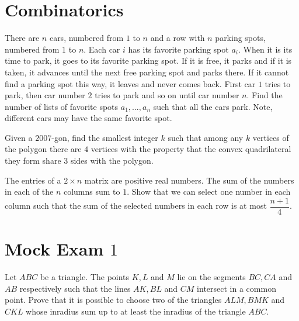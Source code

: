 \documentclass{subfile}
\begin{document}
	\newpage
	
	\section{Combinatorics}
	
	\begin{problem}
		There are $n$ cars, numbered from $1$ to $n$ and a row with $n$ parking spots, numbered from $1$ to $n$. Each car $i$ has its favorite parking spot $a_i$. When it is its time to park, it goes to its favorite parking spot. If it is free, it parks and if it is taken, it advances until the next free parking spot and parks there. If it cannot find a parking spot this way, it leaves and never
		comes back. First car $1$ tries to park, then car number $2$ tries to park and so on until car number $n$. Find the number of lists of favorite spots $a_1, ..., a_n$ such that all the cars park. Note, different cars may have the same favorite spot.
	\end{problem}
	
	\begin{problem}
		Given a $2007$-gon, find the smallest integer $k$ such that among any $k$ vertices of the polygon
		there are $4$ vertices with the property that the convex quadrilateral they form share $3$ sides
		with the polygon.
	\end{problem}
	
	\begin{problem}
		The entries of a $2 \times n$ matrix are positive real numbers. The sum of the numbers in each of the $n$ columns sum to $1$. Show that we can select one number in each column such that the sum of the selected numbers in each row is at most $\dfrac{n+1}{4}$.
	\end{problem}
	
	\newpage
	
	\section{Mock Exam $1$}
	
	\begin{problem}
		Let $ABC$ be a triangle. The points $K, L$ and $M$ lie on the segments $BC, CA$ and $AB$ respectively such that the lines $AK, BL$ and $CM$ intersect in a common point. Prove that it is possible to choose two of the triangles $ALM, BMK$ and $CKL$ whose inradius sum up to at least the inradius of the triangle $ABC$.
	\end{problem}
	
\end{document}
